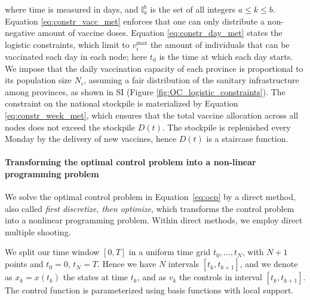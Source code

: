 where time is measured in days, and $\mathbb{I}_a^b$ is the set of all integers $a\leq k\leq b$. Equation \eqref{eq:constr_vacc_met} enforces that one can only distribute a non-negative amount of vaccine doses. Equation \eqref{eq:constr_day_met} states the logistic constraints, which limit to $v_i^\mathrm{max}$ the amount of individuals that can be vaccinated each day in each node; here $t_\mathrm{d}$ is the time at which each day starts. We impose that the daily vaccination capacity of each province is proportional to its population size $N_i$, assuming a fair distribution of the sanitary infrastructure among provinces, as shown in SI (Figure \ref{fig:OC_logistic_constraints}). The constraint on the national stockpile is materialized by Equation
\eqref{eq:constr_week_met}, which ensures that the total vaccine allocation across all nodes does not exceed the stockpile $D(t)$. The stockpile is replenished every Monday by the delivery of new vaccines, hence $D(t)$ is a staircase function.



\paragraph{Transforming the optimal control problem into a non-linear programming problem}


We solve the optimal control problem in Equation~\eqref{eq:ocp} by a direct method, also called \emph{first discretize, then optimize}, which transforms the control problem into a nonlinear programming problem. Within direct methods, we employ direct multiple shooting. 


We split our time window $[0,T]$ in a uniform time grid $t_0,\ldots,t_N$, with $N+1$ points and $t_0=0$, $t_N=T$. Hence we have $N$ intervals $[t_k,t_{k+1}]$, and we denote as $x_k=x(t_k)$ the states at time $t_k$, and as $v_k$ the controls in interval $[t_k,t_{k+1}]$. The control function is parameterized using basis functions with local support. 

